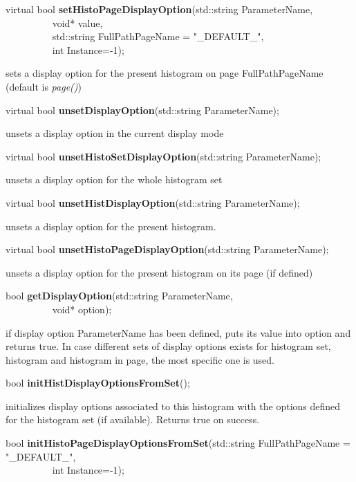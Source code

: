 \item    virtual bool {\bf setHistoPageDisplayOption}(std::string ParameterName,\\\mbox{}~~~~~~~~~ 
					 void* value,\\\mbox{}~~~~~~~~~
					 std::string FullPathPageName = "\_DEFAULT\_",\\\mbox{}~~~~~~~~~
					 int Instance=-1);

 sets a display option for the present histogram on page FullPathPageName (default is {\it page()})


\item    virtual bool {\bf unsetDisplayOption}(std::string ParameterName);


 unsets a display option in the current display mode


\item    virtual bool {\bf unsetHistoSetDisplayOption}(std::string ParameterName); 


 unsets a display option for the whole histogram set


\item    virtual bool {\bf unsetHistDisplayOption}(std::string ParameterName); 


 unsets a display option for the present histogram.


\item    virtual bool {\bf unsetHistoPageDisplayOption}(std::string ParameterName);


 unsets a display option for the present histogram on its page (if defined)


\item    bool {\bf getDisplayOption}(std::string ParameterName,\\\mbox{}~~~~~~~~~
			void* option);

 if display option  ParameterName has been defined, puts its value into
 option and returns true. In case different sets of display options
 exists for histogram set, histogram and histogram in page, the most
 specific one is used.


\item    bool {\bf initHistDisplayOptionsFromSet}(); 


 initializes display options associated to this histogram with the
 options defined for the histogram set (if available). Returns true on
 success.


\item    bool {\bf initHistoPageDisplayOptionsFromSet}(std::string FullPathPageName = "\_DEFAULT\_",\\\mbox{}~~~~~~~~~
					  int Instance=-1);

